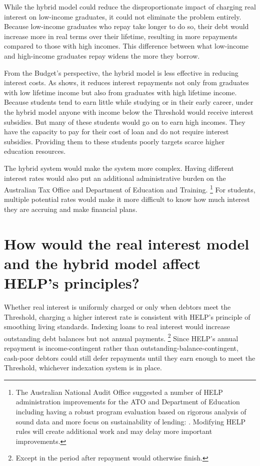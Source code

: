 \documentclass[embargoed]{grattan}
\begin{document}
While the hybrid model could reduce the disproportionate impact of charging real interest on low-income graduates, it could not eliminate the problem entirely.
Because low-income graduates who repay take longer to do so, their debt would increase more in real terms over their lifetime, resulting in more repayments compared to those with high incomes.
This difference between what low-income and high-income graduates repay widens the more they borrow.

From the Budget's perspective, the hybrid model is less effective in reducing interest costs.
As  shows, it reduces interest repayments not only from graduates with low lifetime income but also from graduates with high lifetime income.
Because students tend to earn little while studying or in their early career, under the hybrid model anyone with income below the \gls{Threshold} would receive interest subsidies.
But many of these students would go on to earn high incomes.
They have the capacity to pay for their cost of loan and do not require interest subsidies.
Providing them to these students poorly targets scarce higher education resources.

The hybrid system would make the system more complex.
Having different interest rates would also put an additional administrative burden on the Australian Tax Office and Department of Education and Training.%
\footnote{The Australian National Audit Office suggested a number of \gls{HELP} administration improvements for the \gls{ATO} and Department of Education including having a robust program evaluation based on rigorous analysis of sound data and more focus on sustainability of lending: \textcite[][p.~7, no.~7]{ANAO2016AdministrationHigherEducation}.
Modifying \gls{HELP} rules will create additional work and may delay more important improvements.} 
For students, multiple potential rates would make it more difficult to know how much interest they are accruing and make financial plans.

\section[How would the real interest model and the hybrid model affect {HELP}'s principles?]{How would the real interest model and the hybrid model affect \gls{HELP}'s principles?}\label{how-would-the-real-interest-model-and-the-hybrid-model-affect-helps-principles}

Whether real interest is uniformly charged or only when debtors meet the \gls{Threshold}, charging a higher interest rate is consistent with \gls{HELP}'s principle of smoothing living standards.
Indexing loans to real interest would increase outstanding debt balances but not annual payments.%
\footnote{Except in the period after repayment would otherwise finish.} 
Since \gls{HELP}'s annual repayment is income-contingent rather than outstanding-balance-contingent, cash-poor debtors could still defer repayments until they earn enough to meet the \gls{Threshold}, whichever indexation system is in place.
\end{document}

